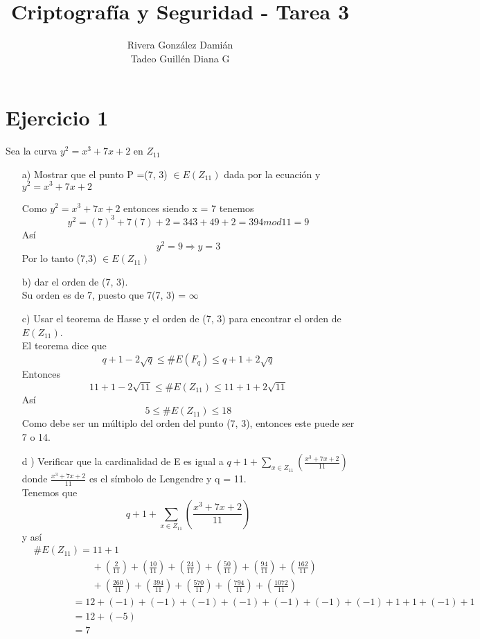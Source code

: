 \documentclass[12pt, letterpaper]{article}
\title{Criptografía y Seguridad - Tarea 3}
\author{Rivera González Damián\\Tadeo Guillén Diana G}
\begin{document}
\maketitle
\section*{Ejercicio 1}
Sea la curva $y^2 = x^3 + 7x + 2$ en $Z_{11}$
\begin{itemize}
\item[a)] Mostrar que el punto P =(7, 3) $\in E(Z_{11})$ dada por la ecuación y $y^2 = x^3 + 7x + 2$

Como $y^2 = x^3 + 7x + 2$ entonces siendo x = 7 tenemos
$$y^2 = (7)^3 + 7(7) + 2 = 343+49+2 = 394 mod 11 = 9$$
Así
$$y^2 = 9 \Rightarrow  y = 3$$
Por lo tanto (7,3) $\in E(Z_{11})$

\item[b) ] dar el orden de (7, 3).\\
Su orden es de 7, puesto que 7(7, 3) = $\infty$

\item[c) ] Usar el teorema de Hasse y el orden de (7, 3) para encontrar el orden de $E(Z_{11})$.\\
El teorema dice que
$$q+1-2\sqrt{q} \leq \#E(F_q) \leq q+1+2\sqrt{q}$$
Entonces
$$11+1-2\sqrt{11} \leq \#E(Z_{11}) \leq 11+1+2\sqrt{11}$$
Así
$$5 \leq \#E(Z_{11}) \leq 18$$
Como debe ser un múltiplo del orden del punto (7, 3), entonces este puede ser 7 o 14.

\item[d ) ] Verificar que la cardinalidad de E es igual a $q+1+ \sum_{x \in Z_{11}} (\frac{x^3 + 7x + 2}{11})$ donde $\frac{x^3 + 7x + 2}{11}$ es el símbolo de Lengendre y q = 11.\\
Tenemos que 
$$q+1+ \sum_{x \in Z_{11}} (\frac{x^3 + 7x + 2}{11})$$
y así
\begin{equation*}
\begin{split}
	&\#E(Z_{11}) = 11+1\\
	&\quad\quad\quad\quad\quad\quad+\left(\frac{2}{11}\right)+\left(\frac{10}{11}\right)+\left(\frac{24}{11}\right)+\left(\frac{50}{11}\right)+\left(\frac{94}{11}\right)+\left(\frac{162}{11}\right)\\
	&\quad\quad\quad\quad\quad\quad+\left(\frac{260}{11}\right)+\left(\frac{394}{11}\right)+\left(\frac{570}{11}\right)+\left(\frac{794}{11}\right)+\left(\frac{1072}{11}\right)\\
	&\quad\quad\quad\quad = 12 + (-1)+(-1)+(-1)+(-1)+(-1)+(-1)+(-1)+1+1+(-1)+1\\
	&\quad\quad\quad\quad = 12 + (-5)\\ 
	&\quad\quad\quad\quad = 7
\end{split}
\end{equation*}
\end{itemize}
\end{document}
